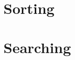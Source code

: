 \documentclass[Main.tex]{subfiles}
\begin{document}
\chapter{Sorting}


\chapter{Searching}

\end{document}
